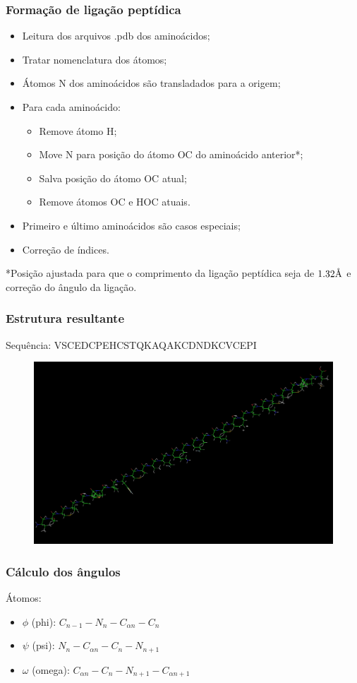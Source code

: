 \documentclass{beamer}
\newcommand{\angstrom}{\textup{\AA}}
\begin{document}
\begin{frame}
\frametitle{Formação de ligação peptídica}
\begin{itemize}
\item Leitura dos arquivos .pdb dos aminoácidos;
\item Tratar nomenclatura dos átomos;
\item Átomos N dos aminoácidos são transladados para a origem;
\item Para cada aminoácido:
\begin{itemize}
 \item Remove átomo H;
 \item Move N para posição do átomo OC do aminoácido anterior*;
 \item Salva posição do átomo OC atual;
 \item Remove átomos OC e HOC atuais.
\end{itemize}
\item Primeiro e último aminoácidos são casos especiais;
\item Correção de índices.
\end{itemize}
\footnotesize{
*Posição ajustada para que o comprimento da ligação peptídica seja de $1.32\angstrom$ e correção do ângulo da ligação.
}
\end{frame}

\begin{frame}
\frametitle{Estrutura resultante}
Sequência: VSCEDCPEHCSTQKAQAKCDNDKCVCEPI
\begin{figure}
\includegraphics[width=0.8\linewidth]{protein.png}
\end{figure}
\end{frame}

\begin{frame}
\frametitle{Cálculo dos ângulos}
Átomos:
\begin{itemize}
  \item $\phi$ (phi): $C_{n-1} - N_{n} - C_{\alpha n} - C_{n}$
  \item $\psi$ (psi): $N_{n} - C_{\alpha n} - C_{n} - N_{n+1}$
  \item $\omega$ (omega): $C_{\alpha n} - C_{n} - N_{n+1} - C_{\alpha n+1}$
\end{itemize}
\end{frame}
\end{document}
